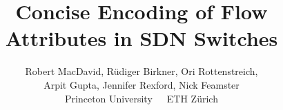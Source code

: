 \documentclass[10pt,twocolumn]{confpaper}
\date{}
\title{
{\ttlfnt Concise Encoding of Flow Attributes in SDN Switches}}
\author{
{\aufnt Robert MacDavid\ptn, R\"udiger Birkner\et, Ori Rottenstreich\ptn,}\\
{\aufnt Arpit Gupta\ptn, Jennifer Rexford\ptn, Nick Feamster\ptn}\\
\ptn\normalsize{Princeton University}~~~\et\normalsize{ETH Z\"{u}rich}\\
}
\begin{document}
\maketitle
\thispagestyle{empty}


\begin{sloppypar}






%






\end{sloppypar}
\balance


%
\end{document}
